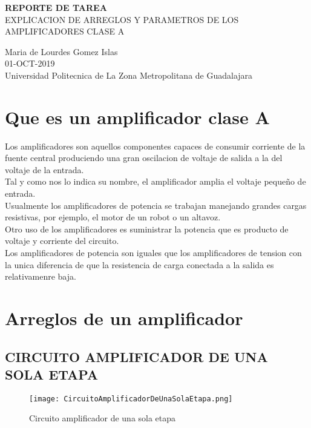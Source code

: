 \documentclass[11pt,a4paper]{article}
\begin{document}
\begin{center}
\textbf{REPORTE DE TAREA}\\
EXPLICACION DE ARREGLOS Y PARAMETROS DE LOS AMPLIFICADORES CLASE A
\end{center}

\begin{center}
Maria de Lourdes Gomez Islas\\
01-OCT-2019\\
Universidad Politecnica de La Zona Metropolitana de Guadalajara
\end{center}


\section{Que es un amplificador clase A}
Los amplificadores son aquellos componentes capaces de consumir corriente de la fuente central produciendo una gran oscilacion de voltaje de salida a la del voltaje de la entrada.\\
Tal y como nos lo indica su nombre, el amplificador amplia el voltaje pequeño de entrada.\\
Usualmente los amplificadores de potencia se trabajan manejando grandes cargas resistivas, por ejemplo, el motor de un robot o un altavoz.\\
Otro uso de los amplificadores es suministrar la potencia que es producto de voltaje y corriente del circuito.\\
Los amplificadores de potencia son iguales que los amplificadores de tension con la unica diferencia de que la resistencia de carga conectada a la salida es relativamenre baja.

\section{Arreglos de un amplificador}
\subsection{CIRCUITO AMPLIFICADOR DE UNA SOLA ETAPA}

\begin{figure}[h]
\centering
\texttt{[image: CircuitoAmplificadorDeUnaSolaEtapa.png]} 
\caption{Circuito amplificador de una sola etapa}
\end{figure}
\end{document}
